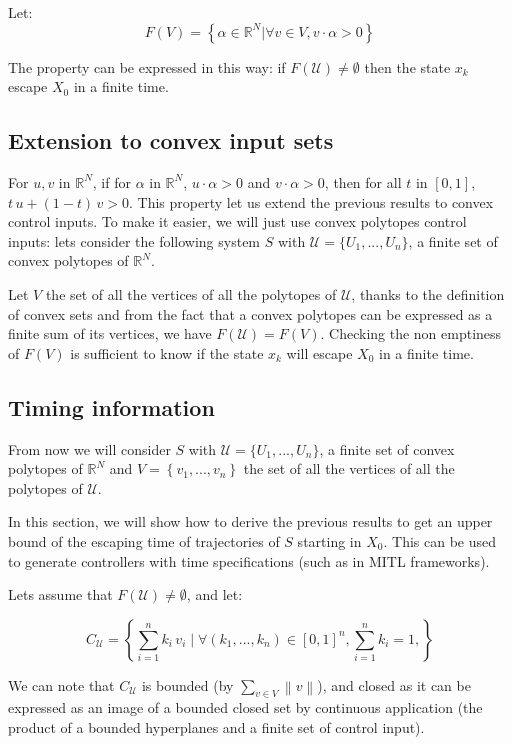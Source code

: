 \documentclass[12pt]{article}
\begin{document}
Let:
$$F(V) = \left \{ \alpha \in \mathbb{R}^N| \forall v \in V, v \cdot \alpha >0 \right \}$$

The property can be expressed in this way:
if $F(\mathcal{U}) \neq \emptyset$ then the state $x_k$ escape $X_0$ in a finite time.

\subsection*{Extension to convex input sets}

For $u,v$ in $\mathbb{R}^N$, if for $\alpha$ in $\mathbb{R}^N$, $u \cdot \alpha > 0$ and $v \cdot \alpha > 0$, then for all $t$ in $[0,1]$, $t \, u + (1-t) \, v > 0$.
This property let us extend the previous results to convex control inputs.
To make it easier, we will just use convex polytopes control inputs:
lets consider the following system $S$ with $\mathcal{U} = \{U_1,...,U_n\}$, a finite set of convex polytopes of $\mathbb{R}^N$.


Let $V$ the set of all the vertices of all the polytopes of $\mathcal{U}$, thanks to the definition of convex sets and from the fact that a convex polytopes can be expressed as a finite sum of its vertices, we have $F(\mathcal{U}) = F(V)$.
Checking the non emptiness of $F(V)$ is sufficient to know if the state $x_k$ will escape $X_0$ in a finite time.

\subsection*{Timing  information}
From now we will consider $S$ with $\mathcal{U} = \{U_1,...,U_n\}$, a finite set of convex polytopes of $\mathbb{R}^N$ and $V = \left \{v_1,...,v_n \right \}$ the set of all the vertices of all the polytopes of $\mathcal{U}$.

In this section, we will show how to derive the previous results to get an upper bound of the escaping time of trajectories of $S$ starting in $X_0$.
This can be used to generate controllers with time specifications (such as in MITL frameworks).

Lets assume that $F(\mathcal{U}) \neq \emptyset$, and let:

\begin{equation}
C_\mathcal{U}=
\left \{
\sum_{i=1}^n k_i \, v_i
\mid 
\forall (k_1,...,k_n) \in [0,1]^n,
\sum_{i=1}^n k_i = 1,
\right \}
\end{equation}

We can note that $C_\mathcal{U}$ is bounded (by $\sum_{v \in V} \left \| v \right \|$), and closed as it can be expressed as an image of a bounded closed set by continuous application (the product of a bounded hyperplanes and a finite set of control input).
\end{document}
